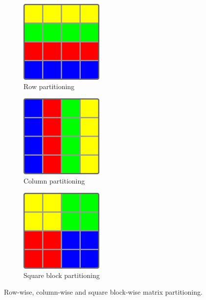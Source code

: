 \begin{figure}[htbp]
	\centering
	\begin{subfigure}{.3\linewidth}
		\centering
		\includegraphics[width=0.45\textwidth]{images/rowPartitioning.png}
		\caption{Row partitioning}
		\label{fig:rowPartitioning}
	\end{subfigure}
	\begin{subfigure}{.3\linewidth}
		\centering
		\includegraphics[width=0.45\textwidth]{images/columnPartitioning.png}
		\caption{Column partitioning}
		\label{fig:columnPartitioning}
	\end{subfigure}
	\begin{subfigure}{.3\linewidth}
		\centering
		\includegraphics[width=0.45\textwidth]{images/quadraticBlockPartitioning.png}
		\caption{Square block partitioning}
		\label{fig:quadraticBlockPartitioning}
	\end{subfigure}
	\caption{Row-wise, column-wise and square block-wise matrix partitioning.}
	\label{fig:Partitionings}
\end{figure}

